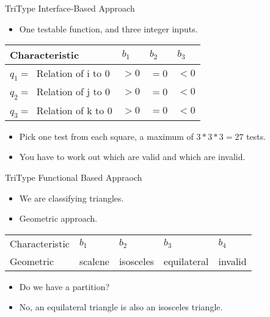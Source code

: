 \documentclass{beamer}
\begin{document}
\begin{frame}{TriType Interface-Based Approach}
  \begin{itemize}
  \item One testable function, and three integer inputs.
  \end{itemize}
  \begin{tabular}{||l|l|l|l||}
\hline 
 Characteristic & $b_1$ &  $b_2$ & $b_3$ \\ \hline
 $q_1 = \ $ Relation of i  to $0$ & $>0$ & $=0$ & $<0$ \\
 $q_2 = \ $ Relation of j  to $0$ & $>0$ & $=0$ & $<0$ \\
 $q_3 = \ $ Relation of k  to $0$ & $>0$ & $=0$ & $<0$ \\
\hline    
\end{tabular}
\begin{itemize}
\item Pick one test from each square, a maximum of $3*3*3=27$ tests. 
\item You have to work out which are valid and which are invalid.
\end{itemize}
\end{frame}
\begin{frame}{TriType  Functional Based Appraoch}
  \begin{itemize}
  \item We are classifying triangles.
  \item Geometric approach.
  \end{itemize}
  \begin{tabular}{||l|l|l|l|l||}\hline 
    Characteristic & $b_1$  & $b_2$ & $b_3$ & $b_4$\\
    Geometric  &  scalene & isosceles &
    equilateral & invalid \\
    \hline
  \end{tabular}
  \begin{itemize}
  \item Do we have a partition? 
  \item No, an equilateral triangle is also an isosceles triangle.
  \end{itemize}
\end{frame}
\end{document}
